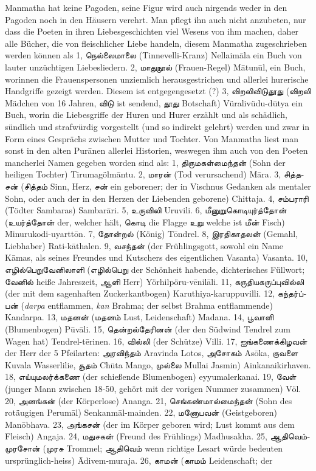 \documentclass{article}
\newcommand{\TamilText}[1]{\texttamil{#1}}
\newcommand{\tam}[1]{\TamilText{#1}}
\begin{document}
Manmatha hat keine Pagoden, seine Figur wird auch nirgends weder in den Pagoden noch in den Häusern verehrt. Man pflegt ihn auch nicht anzubeten, nur dass die Poeten in ihren Liebesgeschichten viel Wesens von ihm machen, daher alle Bücher, die von fleischlicher Liebe handeln, diesem Manmatha zugeschrieben werden können als 1, \tam{நெல்லைமாலை} (Tinnevelli-Kranz) Nellaim\={a}la ein Buch von lauter unzüchtigen Liebesliedern. 2, \tam{மாதுநூல்} (Frauen-Regel) M\={a}tun\={u}l, ein Buch, worinnen die Frauenspersonen unziemlich herausgestrichen und allerlei hurerische Handgriffe gezeigt werden. Diesem ist entgegengesetzt (?) 3, \tam{விறலிவிடுதூது} (\tam{விறலி} Mädchen von 16 Jahren, \tam{விடு} ist sendend, \tam{தூது} Botschaft) Vüralivüdu-d\={u}tya ein Buch, worin die Liebesgriffe der Huren und Hurer erzählt und als schädlich, sündlich und strafwürdig vorgestellt (und so indirekt gelehrt) werden und zwar in Form eines Gesprächs zwischen Mutter und Tochter. Von Manmatha liest man sonst in den alten Pur\={a}nen allerlei Historien, weswegen ihm auch von den Poeten mancherlei Namen gegeben worden sind als: 1, \tam{திருமகள்மைந்தன்} (Sohn der heiligen Tochter) Tirumagölm\={a}ntu. 2, \tam{மாரன்} (Tod verursachend) M\={a}ra. 3, \tam{சித்தசன்} (\tam{சித்தம்} Sinn, Herz, \tam{சன்} ein geborener; der in Vischnus Gedanken als mentaler Sohn, oder auch der in den Herzen der Liebenden geborene) Chittaja. 4, \tam{சம்பராரி} (Tödter Sambaras) Sambar\={a}ri. 5, \tam{உருவிலி} Uruvili. 6, \tam{மீனுறுகொடியுர்த்தோன்} (\tam{உயர்த்தோன்} der, welcher hält, \tam{கொடி} die Flagge \tam{உறு} welche ist \tam{மீன்} Fisch) Minurukodi-uyartt\={o}n. 7, \tam{தோன்றல்} (König) T\={o}ndrel. 8, \tam{இரதிகாதலன்} (Gemahl, Liebhaber) Rati-k\={a}thalen. 9, \tam{வசந்தன்} (der Frühlingsgott, sowohl ein Name K\={a}mas, als seines Freundes und Kutschers des eigentlichen Vasanta) Vasanta. 10, \tam{எழில்பெறுவேனிலாளி} (\tam{எழில்பெறு} der Schönheit habende, dichterisches Füllwort; \tam{வேனில்} heiße Jahreszeit, \tam{ஆளி} Herr) Yörhilpöru-v\={e}nil\={a}li. 11, \tam{கருதியகருப்புவில்லி} (der mit dem sagenhaften Zuckerkantbogen) Karuthiya-karuppuvilli. 12, \tam{கந்தர்ப்பன்} (\emph{darpa} entflammen, \emph{kan} Brahma; der selbst Brahma entflammende) Kandarpa. 13, \tam{மதனன்} (\tam{மதனம்} Lust, Leidenschaft) Madana. 14, \tam{பூவாளி} (Blumenbogen) P\={u}v\={a}li. 15, \tam{தென்றல்தேரினன்} (der den Südwind Tendrel zum Wagen hat) Tendrel-t\={e}rinen. 16, \tam{வில்லி} (der Schütze) Villi. 17, \tam{ஐங்கணைக்கிழவன்} der Herr der 5 Pfeilarten: \tam{அரவிந்தம்} Aravinda Lotos, \tam{அசோகம்} As\={o}ka, \tam{குவளை} Kuvala Wasserlilie, \tam{சூதம்} Ch\={u}ta Mango, \tam{முல்லை} Mullai Jasmin) Ainkanaikirhaven. 18, \tam{எய்யுமலர்க்கணை} (der schießende Blumenbogen) eyyumalerkanai. 19, \tam{வேள்} (junger Mann zwischen 18-50, gehört mit der vorigen Nummer zusammen) Völ. 20, \tam{அனங்கன்} (der Körperlose) Ananga. 21, \tam{செங்கண்மால்மைந்தன்} (Sohn des rotäugigen Perum\={a}l) Senkanm\={a}l-mainden. 22, \tam{மனோபவன்} (Geistgeboren) Man\={o}bhava. 23, \tam{அங்கசன்} (der im Körper geboren wird; Lust kommt aus dem Fleisch) Angaja. 24, \tam{மதுசகன்} (Freund des Frühlings) Madhusakha. 25, \tam{ஆதிவெம்முரசோன்} (\tam{முரசு} Trommel; \tam{ஆதிவெம்} wenn richtige Lesart würde bedeuten ursprünglich-heiss) \={A}divem-muraja. 26, \tam{காமன்} (\tam{காமம்} Leidenschaft; der 
\end{document}
